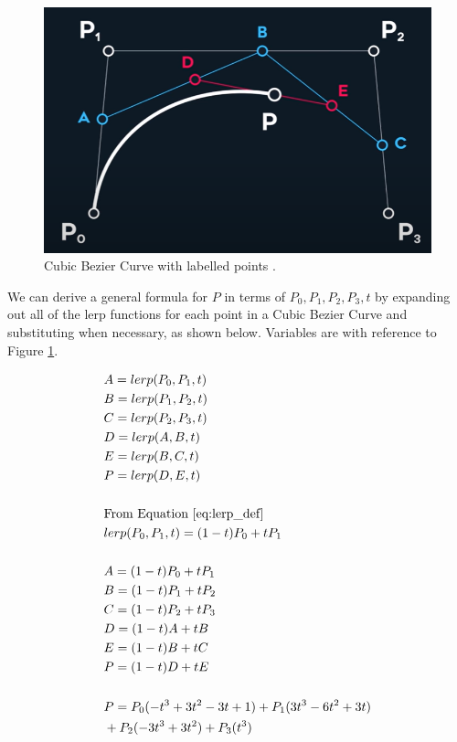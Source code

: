 \documentclass[letterpaper, 12pt]{article}
\begin{document}
\begin{figure}[H]
    \centering
    \includegraphics[width=.8\textwidth]{labelled_cubic.png}
    \caption{Cubic Bezier Curve with labelled points \protect\cite{holmerBeautyBezierCurves2021}.}
    \label{fig:labelled_cubic}
\end{figure}

We can derive a general formula for \(P\) in terms of \(P_0, P_1, P_2, P_3, t\) by expanding out
all of the lerp functions for each point in a Cubic Bezier Curve
and substituting when necessary, as shown below. Variables are
with reference to Figure \ref*{fig:labelled_cubic}.

\begingroup
\allowdisplaybreaks
\begin{align*}
     & A = lerp(P_0, P_1, t)
    \\
     & B = lerp(P_1, P_2, t)
    \\
     & C = lerp(P_2, P_3, t)
    \\
     & D = lerp(A, B, t)
    \\
     & E = lerp(B, C, t)
    \\
     & P = lerp(D, E, t)
    \\
    \\
     & \text{From Equation } \protect\ref*{eq:lerp_def}
    \\
     & lerp(P_0, P_1, t) = (1-t)P_0 + tP_1
    \\
    \\
     & A = (1-t)P_0 + tP_1
    \\
     & B = (1-t)P_1 + tP_2
    \\
     & C = (1-t)P_2 + tP_3
    \\
     & D = (1-t)A + tB
    \\
     & E = (1-t)B + tC
    \\
     & P = (1-t)D + tE
    \\
    \\
     & P = P_0(-t^3+3t^2-3t+1) + P_1(3t^3-6t^2+3t)
    \\
     & + P_2(-3t^3+3t^2) + P_3(t^3)
\end{align*}
\endgroup
\end{document}
